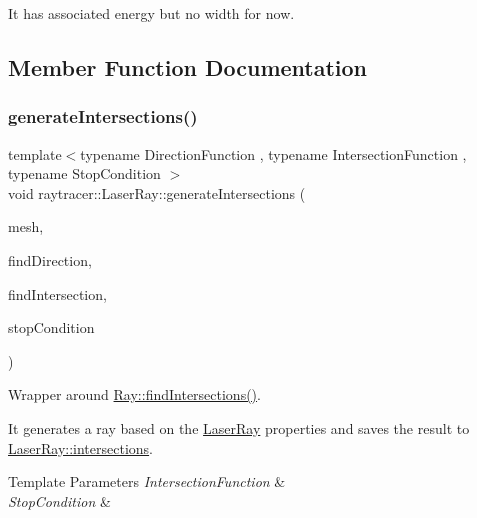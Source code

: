 It has associated energy but no width for now. 

\subsection{Member Function Documentation}
\mbox{\label{classraytracer_1_1LaserRay_a50a1b65c99c56fe6eb7fd89e01f84acf}} 
\subsubsection{\texorpdfstring{generate\+Intersections()}{generateIntersections()}}
{\footnotesize\ttfamily template$<$typename Direction\+Function , typename Intersection\+Function , typename Stop\+Condition $>$ \\
void raytracer\+::\+Laser\+Ray\+::generate\+Intersections (\begin{DoxyParamCaption}\item[{const \hyperlink{classraytracer_1_1Mesh}{Mesh} \&}]{mesh,  }\item[{Direction\+Function}]{find\+Direction,  }\item[{Intersection\+Function}]{find\+Intersection,  }\item[{Stop\+Condition}]{stop\+Condition }\end{DoxyParamCaption})\hspace{0.3cm}{\ttfamily [inline]}}



Wrapper around \hyperlink{classraytracer_1_1Ray_a9ebcb3641ec730e5b94452833b69c68d}{Ray\+::find\+Intersections()}. 

It generates a ray based on the \hyperlink{classraytracer_1_1LaserRay}{Laser\+Ray} properties and saves the result to \hyperlink{classraytracer_1_1LaserRay_a2f15a3a20e496fdc6308d62d0a520bfd}{Laser\+Ray\+::intersections}.


\begin{DoxyTemplParams}{Template Parameters}
{\em Intersection\+Function} & \\
\hline
{\em Stop\+Condition} & \\
\hline
\end{DoxyTemplParams}


